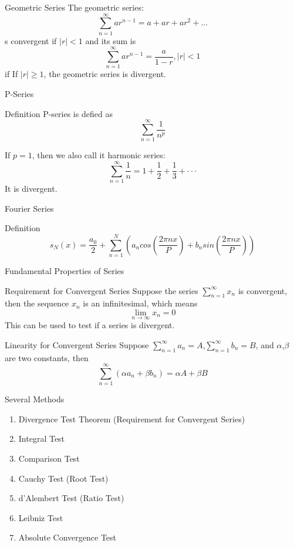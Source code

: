 \documentclass{beamer}
\begin{document}
\begin{frame}{Geometric Series}
    The geometric series:\\
    $$\sum\limits_{n=1}^{\infty} ar^{n-1}=a+ar+ar^2+...$$
    s convergent if $|r| < 1$ and its sum is\\
    $$\sum\limits_{n=1}^{\infty} ar^{n-1} = \frac{a}{1-r}, |r|<1 $$
    if If $|r| \geqslant 1$, the geometric series is divergent.
\end{frame}
\begin{frame}{P-Series}
    \begin{block}{Definition}
        P-series is defied as\\
        $$\sum\limits_{n=1}^{\infty} \frac{1}{n^p}$$
    \end{block}
    If $p = 1$, then we also call it harmonic series:
    $$\sum\limits_{n=1}^{\infty}\frac{1}{n} = 1 +\frac{1}{2}+\frac{1}{3}+\cdot\cdot\cdot$$
    It is divergent.
\end{frame}

\begin{frame}{Fourier Series}
    \begin{block}{Definition}
        $$s_N(x)=\frac{a_0}{2}+\sum\limits^{N}_{n=1}(a_n cos(\frac{2\pi nx}{P})+b_n sin(\frac{2\pi nx}{P}))$$
    \end{block}
\end{frame}

\begin{frame}{Fundamental Properties of Series}
    \begin{block}{Requirement for Convergent Series}
        Suppose the series $\sum_{n=1}^{\infty} x_n$ is convergent, then the sequence $x_n$ is an infinitesimal, which means
        $$\mathop{lim} \limits_{n \rightarrow \infty} x_n = 0$$
        This can be used to test if a series is divergent.
    \end{block}
    \begin{block}{Linearity for Convergent Series}
    Suppose $\sum_{n=1}^{\infty} a_n = A$,$\sum_{n=1}^{\infty} b_n = B$, and $\alpha$,$\beta$ are two constants, then\\
    $$\sum\limits_{n=1}^{\infty}(\alpha a_n + \beta b_n)= \alpha A + \beta B$$
    \end{block}
\end{frame}


\begin{frame}{Several Methods}
    \begin{enumerate}
    \item Divergence Test Theorem (Requirement for Convergent Series)
    \item Integral Test
    \item Comparison Test
    \item Cauchy Test (Root Test)
    \item d’Alembert Test (Ratio Test)
    \item Leibniz Test
    \item Absolute Convergence Test
    \end{enumerate}
\end{frame}
\end{document}
